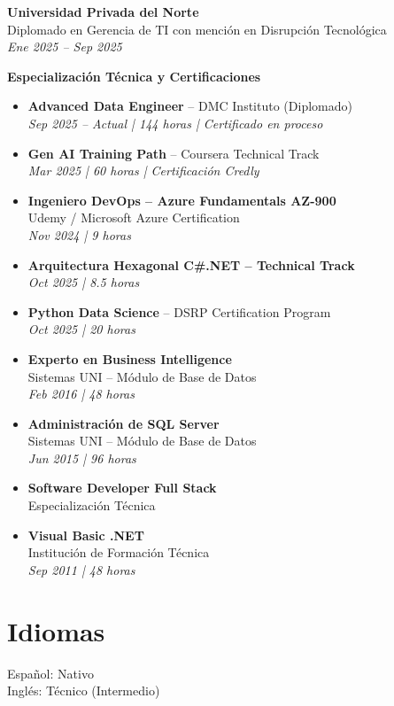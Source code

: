 \documentclass[11pt,a4paper]{article}
\begin{document}
\vspace{4pt}

\textbf{Universidad Privada del Norte}\\
Diplomado en Gerencia de TI con mención en Disrupción Tecnológica\\
\textit{Ene 2025 – Sep 2025}

\vspace{6pt}

\textbf{Especialización Técnica y Certificaciones}

\begin{itemize}[leftmargin=*]
  \item \textbf{Advanced Data Engineer} – DMC Instituto (Diplomado)\\
  \textit{Sep 2025 – Actual | 144 horas | Certificado en proceso}
  
  \item \textbf{Gen AI Training Path} – Coursera Technical Track\\
  \textit{Mar 2025 | 60 horas | Certificación Credly}
  
  \item \textbf{Ingeniero DevOps – Azure Fundamentals AZ-900}\\
  Udemy / Microsoft Azure Certification\\
  \textit{Nov 2024 | 9 horas}
  
  \item \textbf{Arquitectura Hexagonal C\#.NET – Technical Track}\\
  \textit{Oct 2025 | 8.5 horas}
  
  \item \textbf{Python Data Science} – DSRP Certification Program\\
  \textit{Oct 2025 | 20 horas}
  
  \item \textbf{Experto en Business Intelligence}\\
  Sistemas UNI – Módulo de Base de Datos\\
  \textit{Feb 2016 | 48 horas}
  
  \item \textbf{Administración de SQL Server}\\
  Sistemas UNI – Módulo de Base de Datos\\
  \textit{Jun 2015 | 96 horas}
  
  \item \textbf{Software Developer Full Stack}\\
  Especialización Técnica
  
  \item \textbf{Visual Basic .NET}\\
  Institución de Formación Técnica\\
  \textit{Sep 2011 | 48 horas}
\end{itemize}

\section*{Idiomas}

Español: Nativo\\
Inglés: Técnico (Intermedio)
\end{document}

